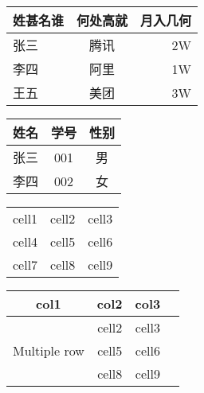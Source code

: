 \begin{table}[ht]
\begin{minipage}[t]{0.45\textwidth}
  \centering
  \label{tab:1}
  \begin{tabular}{|l|c|r|}
    \hline
    姓甚名谁 & 何处高就 & 月入几何 \\
    \hline
    张三& 腾讯 & 2W \\
    \hline
    李四& 阿里 & 1W \\
    \hline
    王五& 美团 & 3W \\
    \hline
  \end{tabular}
\end{minipage}
\begin{minipage}[t]{0.45\textwidth}
  \centering
  \label{tab:2}
  \begin{tabular}{ccc}
    \hline
    姓名& 学号& 性别\\
    \hline
    张三& 001& 男\\
    李四& 002& 女\\
    \hline
  \end{tabular}
\end{minipage}  
\end{table}

\begin{table}[ht]
\begin{minipage}[t]{0.45\textwidth}
  \centering
  \label{tab:3}
  \begin{tabular}{ c c c }
 cell1 & cell2 & cell3 \\ 
 cell4 & cell5 & cell6 \\  
 cell7 & cell8 & cell9    
\end{tabular}
\end{minipage}
\begin{minipage}[t]{0.45\textwidth}
\centering
{}
\label{tab:4}
\begin{tabular}{ |c|c|c|c| } 
\hline
col1 & col2 & col3 \\
\hline
\multirow{3}{4em}{Multiple row} & cell2 & cell3 \\ 
& cell5 & cell6 \\ 
& cell8 & cell9 \\ 
\hline
\end{tabular}
\end{minipage}  
\end{table}

